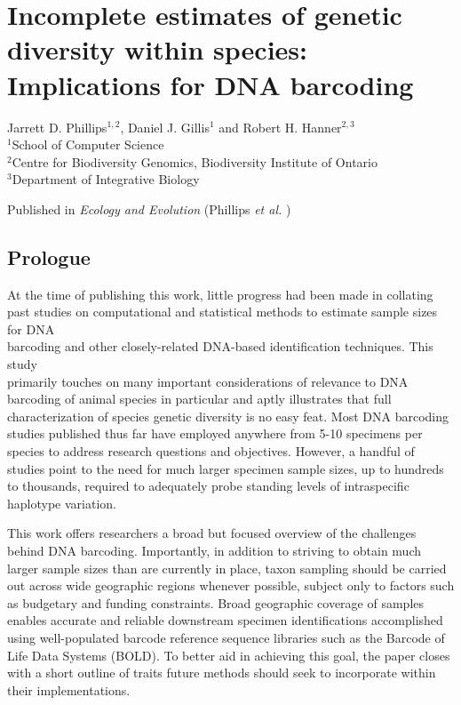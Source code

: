 \chapter{Incomplete estimates of genetic diversity within species: Implications for DNA barcoding}
\linespread{1.0}

\noindent Jarrett D. Phillips$^{1, 2}$, Daniel J. Gillis$^1$ and Robert H. Hanner$^{2, 3}$ \\ $^1$School of Computer Science \\ $^2$Centre for Biodiversity Genomics, Biodiversity Institute of Ontario \\ $^3$Department of Integrative Biology

\vspace{\fill}

\noindent Published in \textit{Ecology and Evolution} (Phillips \textit{et al.} \cite{phillips2019incomplete})


\section{Prologue}

At the time of publishing this work, little progress had been made in collating past studies on computational and statistical methods to estimate sample sizes for DNA \\ barcoding and other closely-related DNA-based identification techniques. This study \\ primarily touches on many important considerations of relevance to DNA barcoding of animal species in particular and aptly illustrates that full characterization of species genetic diversity is no easy feat. Most DNA barcoding studies published thus far have employed anywhere from 5-10 specimens per species to address research questions and objectives. However, a handful of studies point to the need for much larger specimen sample sizes, up to hundreds to thousands, required to adequately probe standing levels of intraspecific haplotype variation.



This work offers researchers a broad but focused overview of the challenges behind DNA barcoding. Importantly, in addition to striving to obtain much larger sample sizes than are currently in place, taxon sampling should be carried out across wide geographic regions whenever possible, subject only to factors such as budgetary and funding constraints. Broad geographic coverage of samples enables accurate and reliable downstream specimen identifications accomplished using well-populated barcode reference sequence libraries such as the Barcode of Life Data Systems (BOLD). To better aid in achieving this goal, the paper closes with a short outline of traits future methods should seek to incorporate within their implementations.

